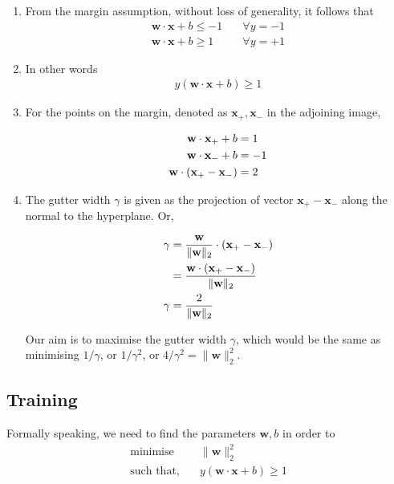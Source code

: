 \documentclass[11pt]{article}
\begin{document}
\begin{enumerate}
\item From the margin assumption, without loss of
generality, it follows that \\[0pt]
\begin{align*}
   \mathbf{w}\cdot\mathbf{x}+b \leqslant -1 &\quad
   \forall y=-1 \\
   \mathbf{w}\cdot\mathbf{x}+b \geqslant 1 &\quad
   \forall y=+1
\end{align*}

\item In other words
\begin{align}
  y(\mathbf{w}\cdot\mathbf{x}+b) \geqslant 1
\end{align}

\item For the points on the margin, denoted as
\(\mathbf{x}_{+}, \mathbf{x}_{-}\) in the adjoining
image,

\begin{align}
  \notag\mathbf{w}\cdot\mathbf{x}_{+} + b &= 1 \\
  \notag\mathbf{w}\cdot\mathbf{x}_{-} + b &= -1 \\
  \mathbf{w}\cdot(\mathbf{x}_{+}-\mathbf{x}_{-}) &= 2
\end{align}

\item The gutter width \(\gamma\) is given as the
projection of vector \(\mathbf{x}_{+} -
    \mathbf{x}_{-}\) along the normal to the hyperplane.
Or,

\begin{align}
  \notag
  \gamma &= \frac{\mathbf{w}}{\|\mathbf{w}\|_2} \cdot
           (\mathbf{x}_{+}-\mathbf{x}_{-}) \\
  \notag &= \frac{\mathbf{w}\cdot
           (\mathbf{x}_{+}-\mathbf{x}_{-})}
           {\|\mathbf{w}\|_2} \\
  \gamma &= \frac{2}{\|\mathbf{w}\|_2}
\end{align}

Our aim is to maximise the gutter width \(\gamma\),
which would be the same as minimising \(1/\gamma\),
or \(1/\gamma^{2}\), or \(4/\gamma^{2} =
    \|\mathbf{w}\|_{2}^{2}\).
\end{enumerate}


\subsection{Training}
\label{sec:org9657c8d}

Formally speaking, we need to find the parameters
\(\mathbf{w},b\) in order to
\begin{align*}
  \text{minimise} &\quad\|\mathbf{w}\|_2^2 \\
  \text{such that,} &\quad y(\mathbf{w}\cdot\mathbf{x}
                      + b) \geqslant 1
\end{align*}
\end{document}
